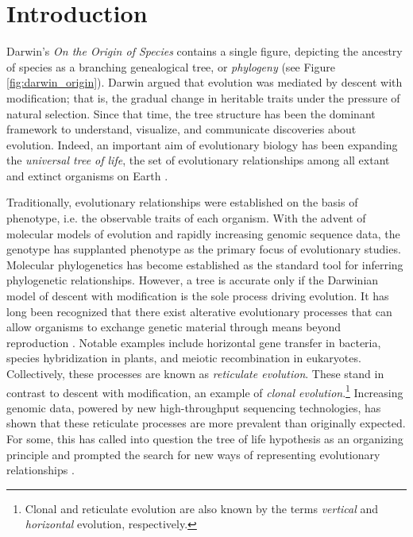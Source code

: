 \chapter{Introduction}
\label{ch:introduction}


Darwin's \emph{On the Origin of Species} contains a single figure, depicting the ancestry of species as a branching genealogical tree, or \emph{phylogeny} \cite{Darwin:1859uh} (see Figure \ref{fig:darwin_origin}).
Darwin argued that evolution was mediated by descent with modification; that is, the gradual change in heritable traits under the pressure of natural selection.
Since that time, the tree structure has been the dominant framework to understand, visualize, and communicate discoveries about evolution.
Indeed, an important aim of evolutionary biology has been expanding the \emph{universal tree of life}, the set of evolutionary relationships among all extant and extinct organisms on Earth \cite{Bowler:2003uz}.

Traditionally, evolutionary relationships were established on the basis of phenotype, i.e. the observable traits of each organism.
With the advent of molecular models of evolution and rapidly increasing genomic sequence data, the genotype has supplanted phenotype as the primary focus of evolutionary studies.
Molecular phylogenetics has become established as the standard tool for inferring phylogenetic relationships.
However, a tree is accurate only if the Darwinian model of descent with modification is the sole process driving evolution.
It has long been recognized that there exist alterative evolutionary processes that can allow organisms to exchange genetic material through means beyond reproduction \cite{Arnold:2007vq}.
Notable examples include horizontal gene transfer in bacteria, species hybridization in plants, and meiotic recombination in eukaryotes.
Collectively, these processes are known as \emph{reticulate evolution}.
These stand in contrast to descent with modification, an example of \emph{clonal evolution}.\footnote{Clonal and reticulate evolution are also known by the terms \emph{vertical} and \emph{horizontal} evolution, respectively.}
Increasing genomic data, powered by new high-throughput sequencing technologies, has shown that these reticulate processes are more prevalent than originally expected.
For some, this has called into question the tree of life hypothesis as an organizing principle and prompted the search for new ways of representing evolutionary relationships \cite{Doolittle:1999,OMalley:2011tu}.

